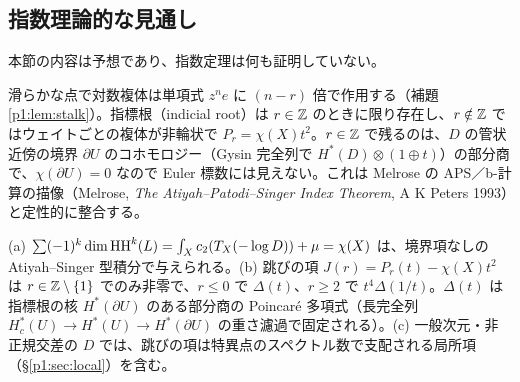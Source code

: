 \subsection{指数理論的な見通し}\label{p1:sec:index}
本節の内容は予想であり、指数定理は何も証明していない。
\begin{obs}
滑らかな点で対数複体は単項式 $z^ne$ に $(n-r)$ 倍で作用する（補題 \ref{p1:lem:stalk}）。指標根（indicial root）は $r\in\mathbb Z$ のときに限り存在し、$r\notin\mathbb Z$ ではウェイトごとの複体が非輪状で $P_r=\chi(X)t^2$。$r\in\mathbb Z$ で残るのは、$D$ の管状近傍の境界 $\partial U$ のコホモロジー（Gysin 完全列で $H^*(D)\otimes(1\oplus t)$）の部分商で、$\chi(\partial U)=0$ なので Euler 標数には見えない。これは Melrose の APS／b-計算の描像（Melrose, \emph{The Atiyah--Patodi--Singer Index Theorem}, A K Peters 1993）と定性的に整合する。
\end{obs}
\begin{conj}\tK\label{p1:conj:I3}
(a) $\sum(-1)^k\dim\mathrm{HH}^k(L)=\int_Xc_2(T_X(-\log D))+\mu=\chi(X)$ は、境界項なしの Atiyah--Singer 型積分で与えられる。(b) 跳びの項 $J(r)=P_r(t)-\chi(X)t^2$ は $r\in\mathbb Z\setminus\{1\}$ でのみ非零で、$r\le0$ で $\Delta(t)$、$r\ge2$ で $t^4\Delta(1/t)$。$\Delta(t)$ は指標根の核 $H^*(\partial U)$ のある部分商の Poincaré 多項式（長完全列 $H_c^*(U)\to H^*(U)\to H^*(\partial U)$ の重さ濾過で固定される）。(c) 一般次元・非正規交差の $D$ では、跳びの項は特異点のスペクトル数で支配される局所項（\S\ref{p1:sec:local}）を含む。
\end{conj}
